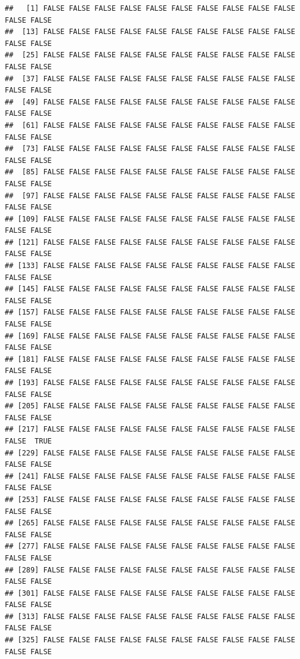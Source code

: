 \documentclass[
]{article}
\begin{document}
\begin{verbatim}
##   [1] FALSE FALSE FALSE FALSE FALSE FALSE FALSE FALSE FALSE FALSE FALSE FALSE
##  [13] FALSE FALSE FALSE FALSE FALSE FALSE FALSE FALSE FALSE FALSE FALSE FALSE
##  [25] FALSE FALSE FALSE FALSE FALSE FALSE FALSE FALSE FALSE FALSE FALSE FALSE
##  [37] FALSE FALSE FALSE FALSE FALSE FALSE FALSE FALSE FALSE FALSE FALSE FALSE
##  [49] FALSE FALSE FALSE FALSE FALSE FALSE FALSE FALSE FALSE FALSE FALSE FALSE
##  [61] FALSE FALSE FALSE FALSE FALSE FALSE FALSE FALSE FALSE FALSE FALSE FALSE
##  [73] FALSE FALSE FALSE FALSE FALSE FALSE FALSE FALSE FALSE FALSE FALSE FALSE
##  [85] FALSE FALSE FALSE FALSE FALSE FALSE FALSE FALSE FALSE FALSE FALSE FALSE
##  [97] FALSE FALSE FALSE FALSE FALSE FALSE FALSE FALSE FALSE FALSE FALSE FALSE
## [109] FALSE FALSE FALSE FALSE FALSE FALSE FALSE FALSE FALSE FALSE FALSE FALSE
## [121] FALSE FALSE FALSE FALSE FALSE FALSE FALSE FALSE FALSE FALSE FALSE FALSE
## [133] FALSE FALSE FALSE FALSE FALSE FALSE FALSE FALSE FALSE FALSE FALSE FALSE
## [145] FALSE FALSE FALSE FALSE FALSE FALSE FALSE FALSE FALSE FALSE FALSE FALSE
## [157] FALSE FALSE FALSE FALSE FALSE FALSE FALSE FALSE FALSE FALSE FALSE FALSE
## [169] FALSE FALSE FALSE FALSE FALSE FALSE FALSE FALSE FALSE FALSE FALSE FALSE
## [181] FALSE FALSE FALSE FALSE FALSE FALSE FALSE FALSE FALSE FALSE FALSE FALSE
## [193] FALSE FALSE FALSE FALSE FALSE FALSE FALSE FALSE FALSE FALSE FALSE FALSE
## [205] FALSE FALSE FALSE FALSE FALSE FALSE FALSE FALSE FALSE FALSE FALSE FALSE
## [217] FALSE FALSE FALSE FALSE FALSE FALSE FALSE FALSE FALSE FALSE FALSE  TRUE
## [229] FALSE FALSE FALSE FALSE FALSE FALSE FALSE FALSE FALSE FALSE FALSE FALSE
## [241] FALSE FALSE FALSE FALSE FALSE FALSE FALSE FALSE FALSE FALSE FALSE FALSE
## [253] FALSE FALSE FALSE FALSE FALSE FALSE FALSE FALSE FALSE FALSE FALSE FALSE
## [265] FALSE FALSE FALSE FALSE FALSE FALSE FALSE FALSE FALSE FALSE FALSE FALSE
## [277] FALSE FALSE FALSE FALSE FALSE FALSE FALSE FALSE FALSE FALSE FALSE FALSE
## [289] FALSE FALSE FALSE FALSE FALSE FALSE FALSE FALSE FALSE FALSE FALSE FALSE
## [301] FALSE FALSE FALSE FALSE FALSE FALSE FALSE FALSE FALSE FALSE FALSE FALSE
## [313] FALSE FALSE FALSE FALSE FALSE FALSE FALSE FALSE FALSE FALSE FALSE FALSE
## [325] FALSE FALSE FALSE FALSE FALSE FALSE FALSE FALSE FALSE FALSE FALSE FALSE
\end{verbatim}
\end{document}
